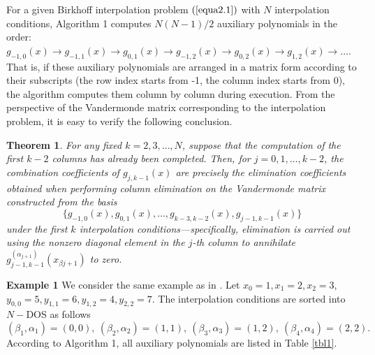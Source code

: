 \documentclass[preprint,12pt]{elsarticle}
\newtheorem{theorem}{Theorem}
\begin{document}
For a given Birkhoff interpolation problem $(\ref{equa2.1})$  with $N$ interpolation conditions, Algorithm 1 computes $N(N-1)/2$ auxiliary polynomials in the order: $g_{-1,0}(x) \rightarrow g_{-1,1} (x)\rightarrow g_{0,1}(x) \rightarrow g_{-1,2}(x) \rightarrow g_{0,2}(x)\rightarrow g_{1,2}(x)  \rightarrow \dots$. That is,  if these auxiliary polynomials are arranged in a matrix form according to their subscripts (the row index starts from -1, the column index starts from 0), the algorithm computes them column by column during execution. From the perspective of the Vandermonde matrix corresponding to the interpolation problem, it is easy to verify the following conclusion.
\begin{theorem}\label{theo10}
For any fixed $k=2,3,\dots,N$, suppose that  the computation of the first $k-2$ columns has already been completed. Then,
for $j=0,1,\dots,k-2$,  the combination coefficients of $g_{j,k-1}(x)$ are  precisely the elimination coefficients obtained when performing column elimination on the Vandermonde matrix constructed from the basis
$$\{g_{-1,0}(x), g_{0,1}(x), \dots, g_{k-3,k-2}(x), g_{j-1,k-1}(x)\}$$
under the first $k$ interpolation conditions—specifically, elimination is carried out using the nonzero diagonal element in the $j$-th column to annihilate $g_{j-1,k-1}^{(\alpha_{j+1})}(x_{\beta{j+1}})$ to zero.
\end{theorem}
\noindent\textbf{Example 1} 
We consider the same example as in \cite{wen27}.
Let $x_0=1, x_1=2, x_2=3$, $y_{0,0}=5, y_{1,1}=6, y_{1,2}=4, y_{2,2}=7$.
The interpolation conditions are sorted into $N-$DOS as follows
\begin{displaymath}
(\beta_1,\alpha_1)=(0,0),\ (\beta_2,\alpha_2)=(1,1),\ (\beta_3,\alpha_3)=(1,2),\ (\beta_4,\alpha_4)=(2,2).
\end{displaymath}
According to Algorithm 1, all  auxiliary polynomials are listed in Table \ref{tbl1}.
\end{document}
